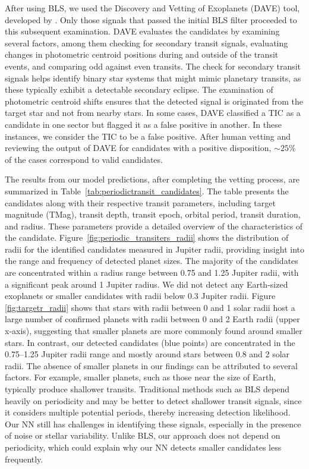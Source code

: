 After using BLS, we used the Discovery and Vetting of Exoplanets (DAVE) tool, developed by \cite{kostov2019discovery}. Only those signals that passed the initial BLS filter proceeded to this subsequent examination. DAVE evaluates the candidates by examining several factors, among them checking for secondary transit signals, evaluating changes in photometric centroid positions during and outside of the transit events, and comparing odd against even transits. The check for secondary transit signals helps identify binary star systems that might mimic planetary transits, as these typically exhibit a detectable secondary eclipse. The examination of photometric centroid shifts ensures that the detected signal is originated from the target star and not from nearby stars. In some cases, DAVE classified a TIC as a candidate in one sector but flagged it as a false positive in another. In these instances, we consider the TIC to be a false positive. After human vetting and reviewing the output of DAVE for candidates with a positive disposition, $\sim 25\%$ of the cases correspond to valid candidates. \par


The results from our model predictions, after completing the vetting process, are summarized in Table~\ref{tab:periodictransit_candidates}. The table presents the candidates along with their respective transit parameters, including target magnitude (TMag), transit depth, transit epoch, orbital period, transit duration, and radius. These parameters provide a detailed overview of the characteristics of the candidate. Figure~\ref{fig:periodic_transiters_radii} shows the distribution of radii for the identified candidates measured in Jupiter radii, providing insight into the range and frequency of detected planet sizes. The majority of the candidates are concentrated within a radius range between 0.75 and 1.25 Jupiter radii, with a significant peak around 1 Jupiter radius. We did not detect any Earth-sized exoplanets or smaller candidates with radii below 0.3 Jupiter radii. Figure \ref{fig:targetr_radii} shows that stars with radii between 0 and 1 solar radii host a large number of confirmed planets with radii between 0 and 2 Earth radii (upper x-axis), suggesting that smaller planets are more commonly found around smaller stars.  In contrast, our detected candidates (blue points) are concentrated in the 0.75–1.25 Jupiter radii range and mostly around stars between 0.8 and 2 solar radii. The absence of smaller planets in our findings can be attributed to several factors. For example, smaller planets, such as those near the size of Earth, typically produce shallower transits. Traditional methods such as BLS depend heavily on periodicity and may be better to detect shallower transit signals, since it considers multiple potential periods, thereby increasing detection likelihood. Our NN still has challenges in identifying these signals, especially in the presence of noise or stellar variability. Unlike BLS, our approach does not depend on periodicity, which could explain why our NN detects smaller candidates less frequently. \par

